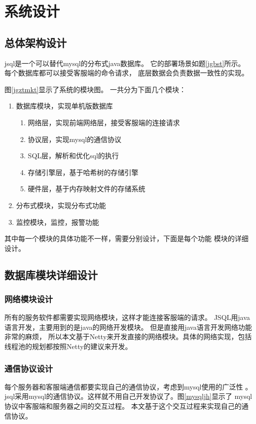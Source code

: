 
\chapter{系统设计}
\section{总体架构设计}
jsql是一个可以替代mysql的分布式java数据库。
它的部署场景如题\ref{jgbst}所示。
每个数据库都可以接受客服端的命令请求，
底层数据会负责数据一致性的实现。

图\ref{jgztmkt}显示了系统的模块图。
一共分为下面几个模块：
\begin{enumerate}
	\item 数据库模块，实现单机版数据库
	\begin{enumerate}
		\item 网络层，实现前端网络层，接受客服端的连接请求
		\item 协议层，实现mysql的通信协议
		\item SQL层，解析和优化sql的执行
		\item 存储引擎层，基于哈希树的存储引擎
		\item 硬件层，基于内存映射文件的存储系统
	\end{enumerate}
	\item 分布式模块，实现分布式功能
	\item 监控模块，监控，报警功能
\end{enumerate}
其中每一个模块的具体功能不一样，需要分别设计，下面是每个功能
模块的详细设计。
\section{数据库模块详细设计}
\subsection{网络模块设计}
所有的服务软件都需要实现网络模块，这样才能连接客服端的请求。
JSQL用java语言开发，主要用到的是java的网络开发模块。
但是直接用java语言开发网络功能非常的麻烦，
所以本文基于Netty来开发直接的网络模块。具体的网络实现，包括
线程池的规划都按照Netty的建议来开发。
\subsection{通信协议设计}
每个服务器和客服端通信都要实现自己的通信协议，考虑到mysql使用的广泛性
。jsql采用mysql的通信协议。这样就不用自己开发协议了。图\ref{mysqljh}显示了
mysql协议中客服端和服务器之间的交互过程。
本文基于这个交互过程来实现自己的通信协议。
